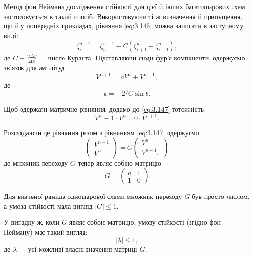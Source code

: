 Метод фон Неймана дослідження стійкості для цієї й інших багатошарових схем застосовується в такий спосіб. Використовуючи ті ж визначення й припущення, що й у попередніх прикладах, рівняння \eqref{eq:3.145} можна записати в наступному виді:
\begin{equation}
    \label{eq:3.146}
    \zeta_i^{n + 1} = \zeta_i^{n - 1} - C (\zeta_{i + 1}^n - \zeta_{i - 1}^n),
\end{equation}
де $C = \frac{u \Delta y}{\Delta x}$ --- число Куранта. Підставляючи сюди фур'є-компоненти, 
одержуємо зв'язок для амплітуд 
\begin{equation}
    \label{eq:3.147}
    V^{n + 1} = a V^n + V^{n - 1},
\end{equation}
де
\begin{equation}
    \label{eq:3.148}
    a = -2/C \sin \theta.
\end{equation}

Щоб одержати матричне рівняння, додамо до \eqref{eq:3.147} тотожність
\begin{equation}
    \label{eq:3.149}
    V^n = 1 \cdot V^n + 0 \cdot V^{n + 1}.
\end{equation}

Розглядаючи це рівняння разом з рівнянням \eqref{eq:3.147} одержуємо
\begin{equation}
    \label{eq:3.150}
    \begin{pmatrix}
        V^{n + 1} \\ V^n
    \end{pmatrix}
    = G
    \begin{pmatrix}
        V^n \\ V^{n - 1},
    \end{pmatrix}
\end{equation}
де множник переходу $G$ тепер являє собою матрицю
\begin{equation}
    \label{eq:3.151}
    G = \begin{pmatrix}
        a & 1 \\ 1 & 0
    \end{pmatrix}
\end{equation}

Для вивченої раніше одношарової схеми множник переходу $G$ був просто числом, а умова стійкості мала вигляд $|G| \le 1$. 

\begin{proposition}
    У випадку ж, коли $G$ являє собою матрицю, умову стійкості (згідно фон Нейману) має такий вигляд:
    \begin{equation}
        \label{eq:3.152}
        |\lambda| \le 1,
    \end{equation}
    де $\lambda$ --- усі можливі власні значення матриці $G$. 
\end{proposition}

